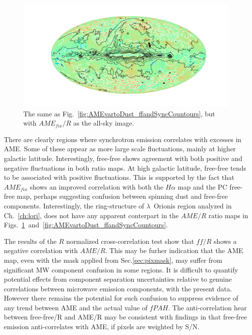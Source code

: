                 \begin{figure}
                    \includegraphics[width=\textwidth]{../Plots/ch_allsky/AMEfixtoDust_ffandSyncCountours.pdf}
                    \centering
                    \caption{The same as Fig.~\ref{fig:AMEvartoDust_ffandSyncCountours}, but with $AME_{fix}/R$ as the all-sky image.}
                    \label{fig:AMEfixtoDust_ffandSyncCountours}
                \end{figure}
             There are clearly regions where synchrotron emission correlates with excesses in AME. Some of these appear as more large scale fluctuations, mainly at higher galactic latitude. Interestingly, free-free shows agreement with both positive and negative fluctuations in both ratio maps. At high galactic latitude, free-free tends to be associated with positive fluctuations. This is supported by the fact that $AME_{fix}$ shows an improved correlation with both the $H\alpha{}$ map and the PC free-free map, perhaps suggesting confusion between spinning dust and free-free components. Interestingly, the ring-structure of $\lambda$~Orionis region analyzed in Ch.~\ref{ch:lori}, does not have any apparent conterpart in the $AME/R$ ratio maps in Figs.~\ref{fig:AMEfixtoDust_ffandSyncCountours}~and~\ref{fig:AMEvartoDust_ffandSyncCountours}.

             The results of the $R$ normalized cross-correlation test show that $ff/R$ shows a negative correlation with $AME/R$. This may be furher indication that the AME map, even with the mask applied from Sec.\ref{sec:pixmask}, may suffer from significant MW component confusion in some regions. It is difficult to quantify potential effects from component separation uncertainties relative to genuine correlations between microwave emission components, with the present data. However there remains the potential for such confusion to suppress evidence of any trend between AME and the actual value of $fPAH$.  The anti-correlation hear between free-free/R and AME/R may be consistent with findings in \cite{vonHausegger15} that free-free emission anti-correlates with AME, if pixels are weighted by S/N.

